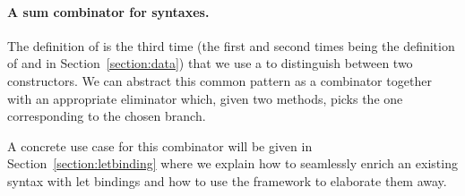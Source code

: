 \paragraph{A sum combinator for syntaxes.}\label{desccomb}

The definition of  is the third time (the first and second
times being the definition of  and  in
Section~\ref{section:data}) that we use a  to distinguish
between two constructors. We can abstract this common pattern as a combinator  together
with an appropriate eliminator  which, given two methods,
picks the one corresponding to the chosen branch.

\begin{center}
\begin{minipage}[t]{0.35\textwidth}
\end{minipage}\hfill
\begin{minipage}[t]{0.55\textwidth}
\end{minipage}
\end{center}



A concrete use case for this combinator will be given in
Section~\ref{section:letbinding}
where we explain how to seamlessly enrich an existing syntax with let bindings
and how to use the \semrec{} framework to elaborate them away.


